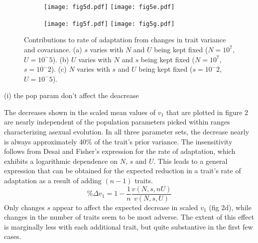 \documentclass[11pt,twocolumn]{article}
\begin{document}
\begin{figure}[h]
\begin{subfigure}[b]{1\linewidth}
\texttt{[image: fig5d.pdf]}
\texttt{[image: fig5e.pdf]}
\end{subfigure}
\begin{subfigure}[b]{1\linewidth}
\centering
\texttt{[image: fig5f.pdf]}
\texttt{[image: fig5g.pdf]}
\end{subfigure}
\label{fig}
\caption{\footnotesize Contributions to rate of adaptation from changes in trait variance and covariance. (a) $s$ varies with $N$ and $U$ being kept fixed ($N= 10^7$, $U=10^-5$). (b) $U$ varies with $N$ and $s$ being kept fixed ($N= 10^7$,$s=10^-2$). (c) $N$ varies with $s$ and $U$ being kept fixed ($s=10^-2$,$U=10^-5$).}
\end{figure}

(i) the pop param don't affect the deacrease

The decreases shown in the scaled mean values of $v_1$ that are plotted in figure 2 are nearly independent of the population parameters picked within ranges characterizing asexual evolution. In all three parameter sets, the decrease nearly is always approximately 40\% of the trait's prior variance. The insensitivity follows from Desai and Fisher's expression for the rate of adaptation, which exhibits a logarithmic dependence on $N$, $s$ and $U$. This leads to a general expression that can be obtained for the expected reduction in a trait's rate of adaptation as a result of adding  $(n-1)$ traits.
\[
\% \Delta v_1 
= 1-\frac{1}{n}\frac{v(N,s,nU)}{v(N,s,U)}
\]
Only changes $s$ appear to affect the expected decrease in scaled $v_1$ (fig 2d), while changes in the number of traits seem to be most adverse. The extent of this effect is marginally less with each additional trait, but quite substantive in the first few cases.
\end{document}
